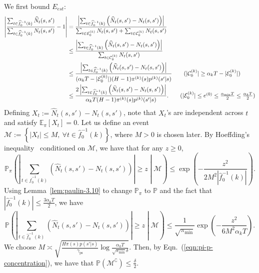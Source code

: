 \documentclass[twoside]{article}
\def\eqref#1{(\ref{#1})}
\def\gC{{\mathcal{C}}}
\def\gE{{\mathcal{E}}}
\def\gM{{\mathcal{M}}}
\def\sP{{\mathbb{P}}}
\newcommand{\E}{\mathbb{E}}
\theoremstyle{plain}
\newcommand{\ps}{\mathrm{ps}}
\begin{document}
We first bound $E_{est}$:
\begin{align*}
    \left| \frac{\sum_{t \in \widehat{f}_0^{-1}(k)} \widehat{N}_t(s, s')}{\sum_{t \in \widehat{f}_0^{-1}(k)} N_t(s, s')} - 1 \right| &= \frac{\left| \sum_{t \in \widehat{f}_0^{-1}(k)} \left( \widehat{N}_t(s, s') - N_t(s, s') \right)\right|}{\sum_{t \in \gE_0^{(k)}} N_t(s, s') + \sum_{t \in \gC_0^{(k)}} N_t(s, s')} \\
    &\leq \frac{\left| \sum_{t \in \widehat{f}_0^{-1}(k)} \left( \widehat{N}_t(s, s') - N_t(s, s') \right)\right|}{\sum_{t \in \gC_0^{(k)}} N_t(s, s')} \\
    &\leq \frac{\left| \sum_{t \in \widehat{f}_0^{-1}(k)} \left( \widehat{N}_t(s, s') - N_t(s, s') \right)\right|}{(\alpha_k T - |\gE_0^{(k)}|) (H - 1) \pi^{(k)}(s) p^{(k)}(s' | s)} \tag{$|\gC_0^{(k)}| \geq \alpha_k T - |\gE_0^{(k)}|$} \\
    &\leq \frac{2 \left| \sum_{t \in \widehat{f}_0^{-1}(k)} \left( \widehat{N}_t(s, s') - N_t(s, s') \right)\right|}{\alpha_k T (H - 1) \pi^{(k)}(s) p^{(k)}(s' | s)}. \tag{$|\gE_0^{(k)}| \leq e^{(0)} \leq \frac{\alpha_{\min} T}{2} \leq \frac{\alpha_k T}{2}$}
\end{align*}
Defining $X_t := \widehat{N}_t(s, s') - N_t(s, s')$, note that $X_t$'s are independent across $t$ and satisfy $\E_\pi[X_t] = 0$.
Let us define an event $\gM := \left\{ |X_t| \leq M, \ \forall t \in \widehat{f}_0^{-1}(k) \right\}$, where $M > 0$ is chosen later.
By Hoeffding's inequality~\citep{hoeffding} conditioned on $\gM$, we have that for any $z \geq 0$,
\begin{equation*}
    \sP_\pi\left( \left| \sum_{t \in \widehat{f}_0^{-1}(k)} \left( \widehat{N}_t(s, s') - N_t(s, s') \right)\right| \geq z \middle| \gM \right) \leq \exp\left( - \frac{z^2}{2 M^2 |\widehat{f}_0^{-1}(k)|} \right).
\end{equation*}
Using Lemma~\ref{lem:paulin-3.10} to change $\sP_\pi$ to $\sP$ and the fact that $|\widehat{f}_0^{-1}(k)| \leq \frac{3\alpha_k T}{2}$, we have
\begin{equation*}
    \sP\left( \left| \sum_{t \in \widehat{f}_0^{-1}(k)} \left( \widehat{N}_t(s, s') - N_t(s, s') \right)\right| \geq z \middle| \gM \right) \leq \frac{1}{\sqrt{\pi_{\min}}} \exp\left( - \frac{z^2}{6 M^2 \alpha_k T} \right).
\end{equation*}
We choose $M \asymp \sqrt{\frac{H \pi(s) p(s' | s)}{\gamma_\ps} \log\frac{\alpha_k T}{\sqrt{\pi_{\min}} \delta}}$.
Then, by Eqn.~\eqref{eqn:pi-p-concentration}, we have that $\sP(\gM^\complement) \leq \frac{\delta}{2}.$
\end{document}
